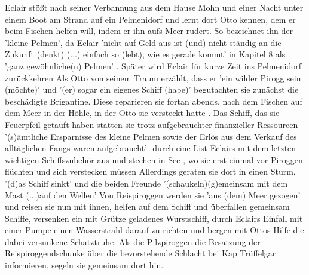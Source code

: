 {Eclair stößt nach seiner Verbannung aus dem Hause Mohn \cite[S.41]{pir} und einer Nacht unter einem Boot am Strand \cite[S.43]{pir} auf ein Pelmenidorf \cite[S.43]{pir} und lernt dort Otto kennen, dem er beim Fischen helfen will, indem er ihn aufs Meer rudert.\cite[S.45]{pir} So bezeichnet ihn der 'kleine Pelmen'\cite[S.45]{pir}, da Eclair 'nicht auf Geld aus ist (und) nicht ständig an die Zukunft (denkt) (...) einfach so (lebt), wie es gerade kommt' in Kapitel 8 als 'ganz gewöhnliche(n) Pelmen' \cite[S.68]{pir}. Später wird Eclair für kurze Zeit ins Pelmenidorf zurückkehren \cite[S.515ff]{pir}Als Otto von seinem Traum erzählt, dass er 'ein wilder Pirogg sein (möchte)'\cite[S.69f]{pir} und '(er) sogar ein eigenes Schiff (habe)' \cite[S.70]{pir} begutachten sie zunächst die beschädigte Brigantine\cite[S.75f]{pir}. Diese reparieren sie fortan abends, nach dem Fischen auf dem Meer\cite[S.90]{pir} in der Höhle, in der Otto sie versteckt hatte \cite[S.74f]{pir}. Das Schiff, das sie Feuerpfeil getauft haben\cite[S.92f]{pir} statten sie trotz aufgebrauchter finanzieller Ressourcen - '(s)ämtliche Ersparnisse des kleine Pelmen sowie der Erlös aus dem Verkauf des alltäglichen Fangs waren aufgebraucht'\cite[S.105]{pir}- durch eine List Eclairs mit dem letzten wichtigen Schiffszubehör aus\cite[S.106ff]{pir} und stechen in See \cite[S.136]{pir}, wo sie erst einmal vor Piroggen flüchten und sich verstecken müssen \cite[S.153ff]{pir} Allerdings geraten sie dort in einen Sturm, '(d)as Schiff sinkt' \cite[S.204]{pir} und die beiden Freunde '(schaukeln)(g)emeinsam mit dem Mast (...)auf den Wellen'\cite[S.205]{pir} Von Reispiroggen werden sie 'aus (dem) Meer gezogen'\cite[S.213]{pir} und reisen sie nun mit ihnen, helfen auf dem Schiff\cite[S.217]{pir} und überfallen gemeinsam Schiffe\cite[S.279ff]{pir}, versenken ein mit Grütze geladenes Wurstschiff,\cite[S.315]{pir} durch Eclairs Einfall mit einer Pumpe einen Wasserstrahl darauf zu richten \cite[S.310ff]{pir} und bergen mit Ottos Hilfe die dabei versunkene Schatztruhe.\cite[S.315f]{pir} Als die Pilzpiroggen die Besatzung der Reispiroggendschunke über die bevorstehende Schlacht bei Kap Trüffelgar informieren, segeln sie gemeinsam dort hin.\cite[S.318ff]{pir}
}
